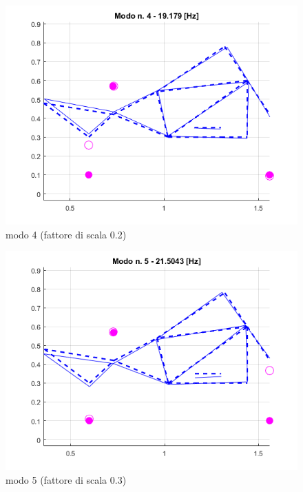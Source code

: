 \documentclass[12pt, a4paper]{article}
\begin{document}
	\begin{figure}[h]
		\centering
		\includegraphics[scale=0.6]{modo_4}
		\caption{modo 4 (fattore di scala 0.2)}
	\end{figure}
	\begin{figure}[h]
		\centering
		\includegraphics[scale=0.6]{modo_5}
		\caption{modo 5 (fattore di scala 0.3)}
	\end{figure}
\end{document}
